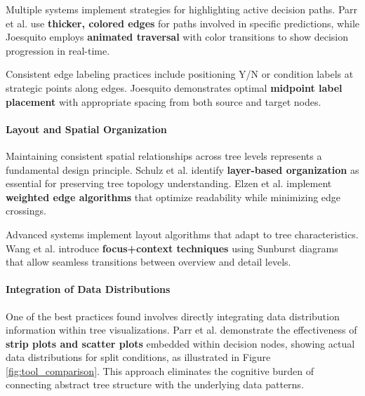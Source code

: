 Multiple systems implement strategies for highlighting active decision paths. Parr et al. \cite{parr2019dtreeviz} use \textbf{thicker, colored edges} for paths involved in specific predictions, while Joesquito \cite{joesquito2024decision} employs \textbf{animated traversal} with color transitions to show decision progression in real-time.

Consistent edge labeling practices include positioning Y/N or condition labels at strategic points along edges. Joesquito \cite{joesquito2024decision} demonstrates optimal \textbf{midpoint label placement} with appropriate spacing from both source and target nodes.

\paragraph{Layout and Spatial Organization}

Maintaining consistent spatial relationships across tree levels represents a fundamental design principle. Schulz et al. \cite{schulz2011treevis} identify \textbf{layer-based organization} as essential for preserving tree topology understanding. Elzen et al. \cite{elzen2011baobabview} implement \textbf{weighted edge algorithms} that optimize readability while minimizing edge crossings.

Advanced systems implement layout algorithms that adapt to tree characteristics. Wang et al. \cite{wang2022timbertrek} introduce \textbf{focus+context techniques} \cite{readingsInformationVi} using Sunburst diagrams \cite{885091} that allow seamless transitions between overview and detail levels.

\paragraph{Integration of Data Distributions}

One of the best practices found involves directly integrating data distribution information within tree visualizations. Parr et al. \cite{parr2019dtreeviz} demonstrate the effectiveness of \textbf{strip plots and scatter plots} embedded within decision nodes, showing actual data distributions for split conditions, as illustrated in Figure \ref{fig:tool_comparison}. This approach eliminates the cognitive burden of connecting abstract tree structure with the underlying data patterns.

